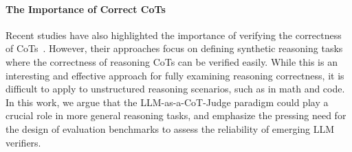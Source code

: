 \paragraph{The Importance of Correct CoTs}
Recent studies have also highlighted the importance of verifying the correctness of CoTs~\citep{arcuschin2025CoTNotFaithful,McGinness2025llm-reason-stall,Shojaee2025IllusionOfThink}.
However, their approaches focus on defining synthetic reasoning tasks where the correctness of reasoning CoTs can be verified easily.
While this is an interesting and effective approach for fully examining reasoning correctness, it is difficult to apply to unstructured reasoning scenarios, such as in math and code. 
In this work, we argue that the LLM-as-a-CoT-Judge paradigm could play a crucial role in more general reasoning tasks, and emphasize the pressing need for the design of evaluation benchmarks to assess the reliability of emerging LLM verifiers.


